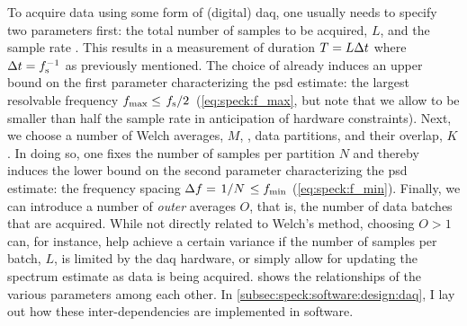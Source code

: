 To acquire data using some form of (digital) \gls{daq}, one usually needs to specify two parameters first: the total number of samples to be acquired, $L$, and the sample rate \fs.
This results in a measurement of duration $T = L\Delta t$ where $\Delta t = f_{\mathrm{s}}^{-1}$ as previously mentioned.
The choice of \fs already induces an upper bound on the first parameter characterizing the \gls{psd} estimate: the largest resolvable frequency $\fmax\leq\flatfrac{\fs}{2}$ (\cf \cref{eq:speck:f_max}, but note that we allow \fmax to be smaller than half the sample rate in anticipation of hardware constraints).
Next, we choose a number of Welch averages, $M$, \ie, data partitions, and their overlap, $K$.
In doing so, one fixes the number of samples per partition $N$ and thereby induces the lower bound on the second parameter characterizing the \gls{psd} estimate: the frequency spacing $\df = \flatfrac{1}{N} \leq \fmin$ (\cf \cref{eq:speck:f_min}).
Finally, we can introduce a number of \emph{outer} averages $O$, that is, the number of data batches that are acquired.
While not directly related to Welch's method, choosing $O > 1$ can, for instance, help achieve a certain variance if the number of samples per batch, $L$, is limited by the \acrlong{daq} hardware, or simply allow for updating the spectrum estimate as data is being acquired.
 shows the relationships of the various parameters among each other.
In \cref{subsec:speck:software:design:daq}, I lay out how these inter-dependencies are implemented in software.

